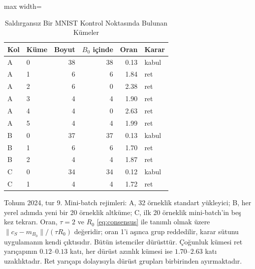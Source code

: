 \begin{table}[!t]
\centering\footnotesize
\setlength{\tabcolsep}{4pt}
\caption{Saldırgansız Bir MNIST Kontrol Noktasında Bulunan Kümeler}\label{tab:cluster_ratios}
\begin{adjustbox}{max width=\columnwidth}
\begin{tabular}{llrrrl}
\toprule
Kol & Küme & Boyut & $B_0$ içinde & Oran & Karar \\
\midrule
A & 0 & 38 & 38 & 0.13 & kabul \\
A & 1 & 6 & 6 & 1.84 & ret \\
A & 2 & 6 & 0 & 2.38 & ret \\
A & 3 & 4 & 4 & 1.90 & ret \\
A & 4 & 4 & 0 & 2.63 & ret \\
A & 5 & 4 & 4 & 1.99 & ret \\
B & 0 & 37 & 37 & 0.13 & kabul \\
B & 1 & 6 & 6 & 1.70 & ret \\
B & 2 & 4 & 4 & 1.87 & ret \\
C & 0 & 34 & 34 & 0.12 & kabul \\
C & 1 & 4 & 4 & 1.72 & ret \\
\bottomrule
\end{tabular}
\end{adjustbox}

\par\vspace{3pt}\parbox{\linewidth}{\footnotesize Tohum 2024, tur 9. Mini-batch rejimleri: A, 32 örneklik standart yükleyici; B, her yerel adımda yeni bir 20 örneklik altküme; C, ilk 20 örneklik mini-batch'in beş kez tekrarı. Oran, $\tau=2$ ve $R_0$ \eqref{eq:consensus} ile tanımlı olmak üzere $\lVert c_S-m_{B_0}\rVert/(\tau R_0)$ değeridir; oran 1'i aşınca grup reddedilir, karar sütunu uygulamanın kendi çıktısıdır. Bütün istemciler dürüsttür. Çoğunluk kümesi ret yarıçapının $0.12$--$0.13$ katı, her dürüst azınlık kümesi ise $1.70$--$2.63$ katı uzaklıktadır. Ret yarıçapı dolayısıyla dürüst grupları birbirinden ayırmaktadır.}
\end{table}
